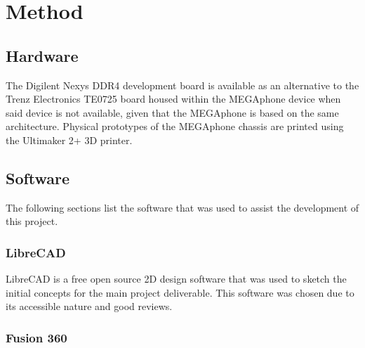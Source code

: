 
\chapter{Method} %

\label{Chapter3} %


\section{Hardware}

The Digilent Nexys DDR4 development board is available as an alternative to the Trenz Electronics TE0725 board housed within the MEGAphone device when said device is not available, given that the MEGAphone is based on the same architecture. 
Physical prototypes of the MEGAphone chassis are printed using the Ultimaker 2+ 3D printer.


\section{Software}

The following sections list the software that was used to assist the development of this project.


\subsection{LibreCAD}

LibreCAD is a free open source 2D design software that was used to sketch the initial concepts for the main project deliverable. 
This software was chosen due to its accessible nature and good reviews.


\subsection{Fusion 360}

